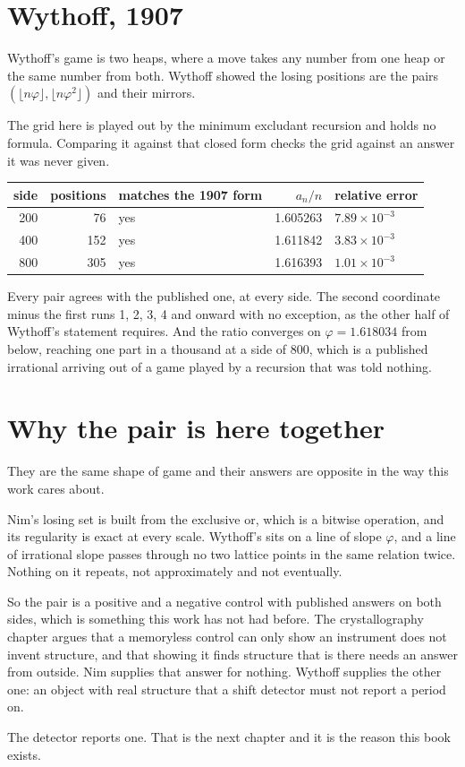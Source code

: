 \section{Wythoff, 1907}

Wythoff's game is two heaps, where a move takes any number from one heap or the same number from
both. Wythoff showed the losing positions are the pairs
\(\left(\lfloor n\varphi \rfloor, \lfloor n\varphi^{2} \rfloor\right)\) and their mirrors.

The grid here is played out by the minimum excludant recursion and holds no formula. Comparing it
against that closed form checks the grid against an answer it was never given.

\begin{center}
\begin{tabular}{@{}rrlrl@{}}
\toprule
side & positions & matches the 1907 form & \(a_n/n\) & relative error \\
\midrule
200 & 76 & yes & 1.605263 & \(7.89\times10^{-3}\) \\
400 & 152 & yes & 1.611842 & \(3.83\times10^{-3}\) \\
800 & 305 & yes & 1.616393 & \(1.01\times10^{-3}\) \\
\bottomrule
\end{tabular}
\end{center}

Every pair agrees with the published one, at every side. The second coordinate minus the first runs
1, 2, 3, 4 and onward with no exception, as the other half of Wythoff's statement requires. And the
ratio converges on \(\varphi = 1.618034\) from below, reaching one part in a thousand at a side of
800, which is a published irrational arriving out of a game played by a recursion that was told
nothing.

\section{Why the pair is here together}

They are the same shape of game and their answers are opposite in the way this work cares about.

Nim's losing set is built from the exclusive or, which is a bitwise operation, and its regularity is
exact at every scale. Wythoff's sits on a line of slope \(\varphi\), and a line of irrational slope
passes through no two lattice points in the same relation twice. Nothing on it repeats, not
approximately and not eventually.

So the pair is a positive and a negative control with published answers on both sides, which is
something this work has not had before. The crystallography chapter argues that a memoryless control
can only show an instrument does not invent structure, and that showing it finds structure that is
there needs an answer from outside. Nim supplies that answer for nothing. Wythoff supplies the other
one: an object with real structure that a shift detector must not report a period on.

The detector reports one. That is the next chapter and it is the reason this book exists.
